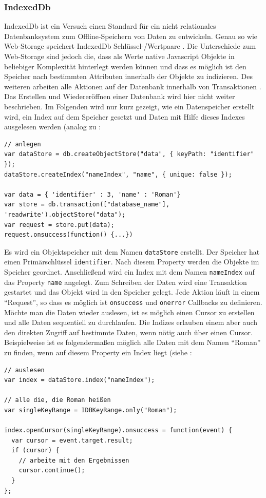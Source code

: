 \subsubsection{IndexedDb}
IndexedDb ist ein Versuch einen Standard für ein nicht relationales Datenbanksystem zum Offline-Speichern von Daten zu entwickeln. Genau so wie Web-Storage speichert IndexedDb Schlüssel-/Wertpaare \cite{Mehta2012}. Die Unterschiede zum Web-Storage sind jedoch die, dass als Werte native Javascript Objekte in beliebiger Komplexität hinterlegt werden können  und dass es möglich ist den Speicher nach bestimmten Attributen innerhalb der Objekte zu indizieren. Des weiteren arbeiten alle Aktionen auf der Datenbank innerhalb von Transaktionen \cite{MDN2011}. Das Erstellen und Wiedereröffnen einer Datenbank wird hier nicht weiter beschrieben. Im Folgenden wird nur kurz gezeigt, wie ein Datenspeicher erstellt wird, ein Index auf dem Speicher gesetzt und Daten mit Hilfe dieses Indexes ausgelesen werden (analog zu \cite{Mahemoff2010}:

\begin{lstlisting}
// anlegen
var dataStore = db.createObjectStore("data", { keyPath: "identifier" });
dataStore.createIndex("nameIndex", "name", { unique: false });

var data = { 'identifier' : 3, 'name' : 'Roman'}
var store = db.transaction(["database_name"], 'readwrite').objectStore("data");
var request = store.put(data);
request.onsuccess(function() {...})
\end{lstlisting}  
Es wird ein Objektspeicher mit dem Namen \texttt{dataStore} erstellt. Der Speicher hat einen Primärschlüssel \texttt{identifier}. Nach diesem Property werden die Objekte im Speicher geordnet. Anschließend wird ein Index mit dem Namen \texttt{nameIndex} auf das Property \texttt{name} angelegt. Zum Schreiben der Daten wird eine Transaktion gestartet und das Objekt wird in den Speicher gelegt. Jede Aktion läuft in einem "`Request"', so dass es möglich ist \texttt{onsuccess} und \texttt{onerror} Callbacks zu definieren. Möchte man die Daten wieder auslesen, ist es möglich einen Cursor zu erstellen und alle Daten sequentiell zu durchlaufen. Die Indizes erlauben einem aber auch den direkten Zugriff auf bestimmte Daten, wenn nötig auch über einen Cursor.  Beispielweise ist es folgendermaßen möglich alle Daten mit dem Namen "`Roman"' zu finden, wenn auf diesem Property ein Index liegt (siehe \cite{MDN2011}:
\begin{lstlisting}
// auslesen
var index = dataStore.index("nameIndex");

// alle die, die Roman heißen
var singleKeyRange = IDBKeyRange.only("Roman");
 
index.openCursor(singleKeyRange).onsuccess = function(event) {
  var cursor = event.target.result;
  if (cursor) {
    // arbeite mit den Ergebnissen
    cursor.continue();
  }
};
\end{lstlisting} 

